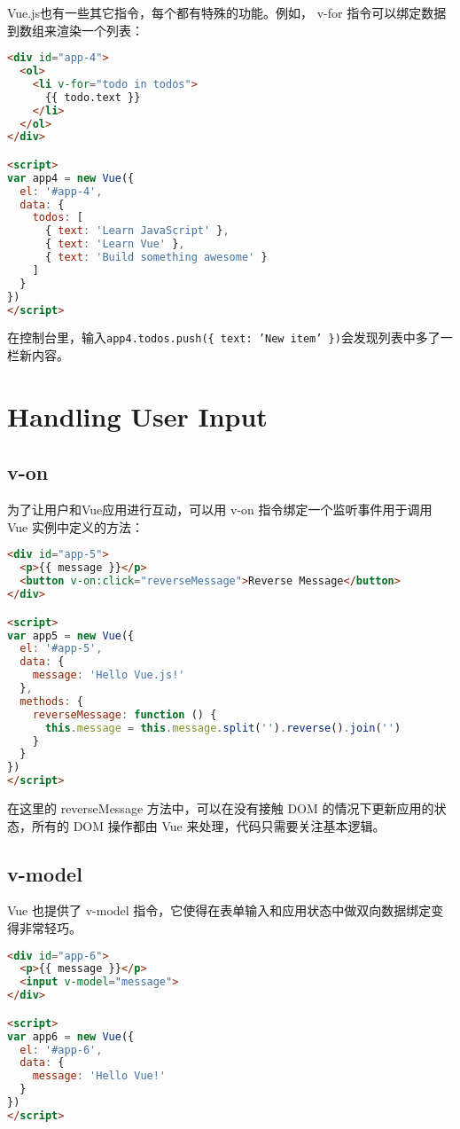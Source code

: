 Vue.js也有一些其它指令，每个都有特殊的功能。例如， v-for 指令可以绑定数据到数组来渲染一个列表：

\begin{lstlisting}[language=HTML]
<div id="app-4">
  <ol>
    <li v-for="todo in todos">
      {{ todo.text }}
    </li>
  </ol>
</div>

<script>
var app4 = new Vue({
  el: '#app-4',
  data: {
    todos: [
      { text: 'Learn JavaScript' },
      { text: 'Learn Vue' },
      { text: 'Build something awesome' }
    ]
  }
})
</script>
\end{lstlisting}

在控制台里，输入\texttt{app4.todos.push(\{ text: 'New item' \})}会发现列表中多了一栏新内容。

\section{Handling User Input}


\subsection{v-on}


为了让用户和Vue应用进行互动，可以用 v-on 指令绑定一个监听事件用于调用 Vue 实例中定义的方法：

\begin{lstlisting}[language=HTML]
<div id="app-5">
  <p>{{ message }}</p>
  <button v-on:click="reverseMessage">Reverse Message</button>
</div>

<script>
var app5 = new Vue({
  el: '#app-5',
  data: {
    message: 'Hello Vue.js!'
  },
  methods: {
    reverseMessage: function () {
      this.message = this.message.split('').reverse().join('')
    }
  }
})
</script>
\end{lstlisting}

在这里的 reverseMessage 方法中，可以在没有接触 DOM 的情况下更新应用的状态，所有的 DOM 操作都由 Vue 来处理，代码只需要关注基本逻辑。


\subsection{v-model}


Vue 也提供了 v-model 指令，它使得在表单输入和应用状态中做双向数据绑定变得非常轻巧。




\begin{lstlisting}[language=HTML]
<div id="app-6">
  <p>{{ message }}</p>
  <input v-model="message">
</div>

<script>
var app6 = new Vue({
  el: '#app-6',
  data: {
    message: 'Hello Vue!'
  }
})
</script>
\end{lstlisting}


